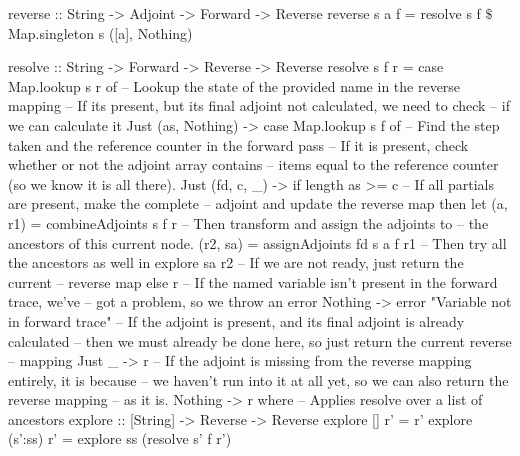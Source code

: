         \begin{haskell}[caption=Definition of the reverse pass functions, label=lst:reverse_func, gobble=12]
            reverse :: String -> Adjoint -> Forward -> Reverse
            reverse s a f = resolve s f $\$$ Map.singleton s ([a], Nothing)

            resolve :: String -> Forward -> Reverse -> Reverse
            resolve s f r = case Map.lookup s r of
                -- Lookup the state of the provided name in the reverse mapping
                -- If its present, but its final adjoint not calculated, we need to check
                -- if we can calculate it
                Just (as, Nothing) -> case Map.lookup s f of
                    -- Find the step taken and the reference counter in the forward pass
                    -- If it is present, check whether or not the adjoint array contains
                    -- items equal to the reference counter (so we know it is all there).
                    Just (fd, c, _) -> if   length as >= c
                                       -- If all partials are present, make the complete
                                       -- adjoint and update the reverse map
                                       then let (a,  r1) = combineAdjoints s f r
                                            -- Then transform and assign the adjoints to
                                            -- the ancestors of this current node.
                                                (r2, sa) = assignAdjoints fd s a f r1
                                            -- Then try all the ancestors as well
                                            in  explore sa r2
                                       -- If we are not ready, just return the current
                                       -- reverse map
                                       else r
                    -- If the named variable isn't present in the forward trace, we've
                    -- got a problem, so we throw an error
                    Nothing         -> error "Variable not in forward trace"
                -- If the adjoint is present, and its final adjoint is already calculated
                -- then we must already be done here, so just return the current reverse
                -- mapping
                Just _             -> r
                -- If the adjoint is missing from the reverse mapping entirely, it is because
                -- we haven't run into it at all yet, so we can also return the reverse mapping
                -- as it is.
                Nothing            -> r
                where
                    -- Applies resolve over a list of ancestors
                    explore :: [String] -> Reverse -> Reverse
                    explore []      r' = r'
                    explore (s':ss) r' = explore ss (resolve s' f r')
        \end{haskell}

